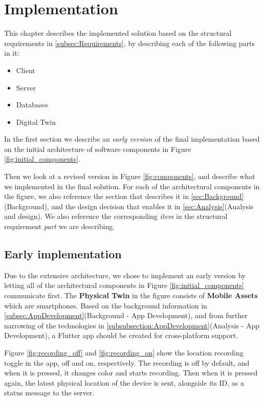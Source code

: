 \documentclass{article}
\begin{document}
\section{Implementation}\label{sec:Implementation}
This chapter describes the implemented solution based on the structural requirements in \ref{subsec:Requirements}, by describing each of the following parts in it:
\begin{itemize}
    \item Client
    \item Server
    \item Databases
    \item Digital Twin
\end{itemize}
In the first section we describe an \emph{early version} of the final implementation based on the initial architecture of software components in Figure \ref{fig:initial_components}. 

Then we look at a revised version in Figure \ref{fig:components}, and describe what we implemented in the final solution. For each of the architectural components in the figure, we also reference the section that describes it in \ref{sec:Background}(Background), and the design decision that enables it in \ref{sec:Analysis}(Analysis and design). We also reference the corresponding \emph{item} in the structural requirement \emph{part} we are describing.

\subsection{Early implementation}
Due to the extensive architecture, we chose to implement an early version by letting all of the architectural components in Figure \ref{fig:initial_components} communicate first. The \textbf{Physical Twin} in the figure consists of \textbf{Mobile Assets} which are smartphones. Based on the background information in \ref{subsec:AppDevelopment}(Background - App Development), and from further narrowing of the technologies in \ref{subsubsection:AppDevelopment}(Analysis - App Development), a Flutter app should be created for cross-platform support.

Figure \ref{fig:recording_off} and \ref{fig:recording_on} show the location recording toggle in the app, off and on, respectively. The recording is off by default, and when it is pressed, it changes color and starts recording. Then when it is pressed again, the latest physical location of the device is sent, alongside its ID, as a status message to the server.
\end{document}
